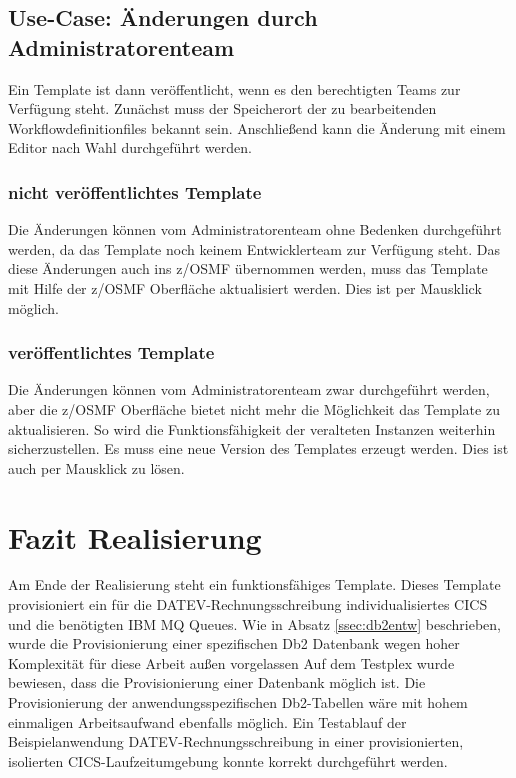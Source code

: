 \subsection{Use-Case: Änderungen durch Administratorenteam}
Ein Template ist dann veröffentlicht, wenn es den berechtigten Teams zur Verfügung steht.
Zunächst muss der Speicherort der zu bearbeitenden Workflowdefinitionfiles bekannt sein.
Anschließend kann die Änderung mit einem Editor nach Wahl durchgeführt werden.

\subsubsection{nicht veröffentlichtes Template}
Die Änderungen können vom Administratorenteam ohne Bedenken durchgeführt werden, da das Template noch keinem Entwicklerteam zur Verfügung steht.
Das diese Änderungen auch ins z/OSMF übernommen werden, muss das Template mit Hilfe der z/OSMF Oberfläche aktualisiert werden.
Dies ist per Mausklick möglich.

\subsubsection{veröffentlichtes Template}
Die Änderungen können vom Administratorenteam zwar durchgeführt werden, aber die z/OSMF Oberfläche bietet nicht mehr die Möglichkeit das Template zu aktualisieren.
So wird die Funktionsfähigkeit der veralteten Instanzen weiterhin sicherzustellen.
Es muss eine neue Version des Templates erzeugt werden.
Dies ist auch per Mausklick zu lösen.

\section{Fazit Realisierung}
Am Ende der Realisierung steht ein funktionsfähiges Template.
Dieses Template provisioniert ein für die DATEV-Rechnungsschreibung individualisiertes CICS und die benötigten IBM MQ Queues. 
Wie in Absatz \ref{ssec:db2entw} beschrieben, wurde die Provisionierung einer spezifischen Db2 Datenbank wegen hoher Komplexität für diese Arbeit außen vorgelassen
Auf dem Testplex wurde bewiesen, dass die Provisionierung einer Datenbank möglich ist.
Die Provisionierung der anwendungsspezifischen Db2-Tabellen wäre mit hohem einmaligen Arbeitsaufwand ebenfalls möglich.
Ein Testablauf der Beispielanwendung DATEV-Rechnungsschreibung in einer provisionierten, isolierten CICS-Laufzeitumgebung konnte korrekt durchgeführt werden.

